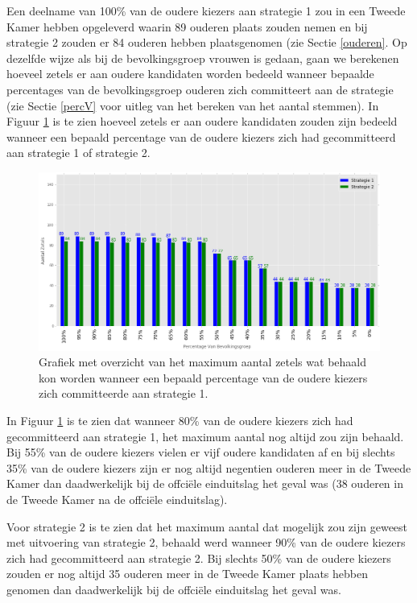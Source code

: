 \indent Een deelname van 100\% van de oudere kiezers aan strategie 1 zou in een Tweede Kamer hebben opgeleverd waarin 89 ouderen plaats zouden nemen en bij strategie 2 zouden er 84 ouderen hebben plaatsgenomen (zie Sectie \ref{ouderen}. Op dezelfde wijze als bij de bevolkingsgroep vrouwen is gedaan, gaan we berekenen hoeveel zetels er aan oudere kandidaten worden bedeeld wanneer bepaalde percentages van de bevolkingsgroep ouderen zich committeert aan de strategie (zie Sectie \ref{percV} voor uitleg van het bereken van het aantal stemmen). In Figuur \ref{fig:PerO} is te zien hoeveel zetels er aan oudere kandidaten zouden zijn bedeeld wanneer een bepaald percentage van de oudere kiezers zich had gecommitteerd aan strategie 1 of strategie 2.  



\begin{figure}[H]
	\includegraphics[width=\linewidth]{percentages_van_ouderenS1S2.png}

			\caption{Grafiek met overzicht van het maximum aantal zetels wat behaald kon worden wanneer een bepaald percentage van de oudere kiezers zich committeerde aan strategie 1.}

\label{fig:PerO}
\end{figure}

In Figuur \ref{fig:PerO} is te zien dat wanneer 80\% van de oudere kiezers zich had gecommitteerd aan strategie 1, het maximum aantal nog altijd zou zijn behaald. Bij 55\% van de oudere kiezers vielen er vijf oudere kandidaten af en bij slechts 35\% van de oudere kiezers zijn er nog altijd negentien ouderen meer in de Tweede Kamer dan daadwerkelijk bij de offci\"{e}le einduitslag het geval was (38 ouderen in de Tweede Kamer na de offci\"{e}le einduitslag). 

Voor strategie 2 is te zien dat het maximum aantal dat mogelijk zou zijn geweest met uitvoering van strategie 2, behaald werd wanneer 90\% van de oudere kiezers zich had gecommitteerd aan strategie 2. Bij slechts 50\% van de oudere kiezers zouden er nog altijd 35 ouderen meer in de Tweede Kamer plaats hebben genomen dan daadwerkelijk bij de offci\"{e}le einduitslag het geval was.



